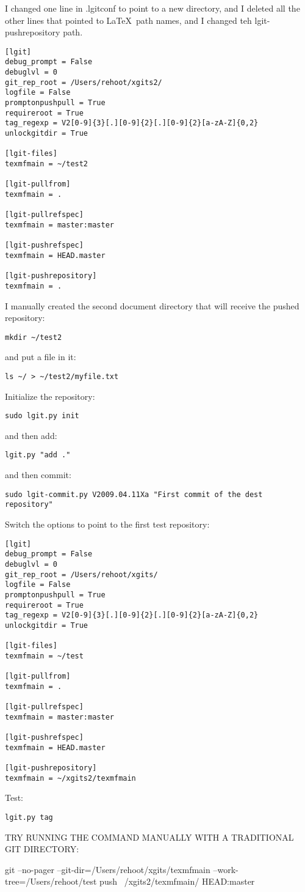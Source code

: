 \documentclass{ltxdoc}
\begin{document}
I changed one line in .lgitconf to point to a new directory, and I deleted all the other lines that pointed to \LaTeX\ path names, and I changed teh lgit-pushrepository path.
\begin{verbatim}
[lgit]
debug_prompt = False
debuglvl = 0
git_rep_root = /Users/rehoot/xgits2/
logfile = False
promptonpushpull = True
requireroot = True
tag_regexp = V2[0-9]{3}[.][0-9]{2}[.][0-9]{2}[a-zA-Z]{0,2}
unlockgitdir = True

[lgit-files]
texmfmain = ~/test2

[lgit-pullfrom]
texmfmain = .

[lgit-pullrefspec]
texmfmain = master:master

[lgit-pushrefspec]
texmfmain = HEAD.master

[lgit-pushrepository]
texmfmain = .
\end{verbatim}


I manually created the second document directory that will receive the pushed repository:
\begin{verbatim}
mkdir ~/test2
\end{verbatim}
and put a file in it:
\begin{verbatim}
ls ~/ > ~/test2/myfile.txt
\end{verbatim}

Initialize the repository:
\begin{verbatim}
sudo lgit.py init
\end{verbatim}
and then add:
\begin{verbatim}
lgit.py "add ."
\end{verbatim}
and then commit:
\begin{verbatim}
sudo lgit-commit.py V2009.04.11Xa "First commit of the dest repository"
\end{verbatim}

Switch the options to point to the first test repository:
\begin{verbatim}
[lgit]
debug_prompt = False
debuglvl = 0
git_rep_root = /Users/rehoot/xgits/
logfile = False
promptonpushpull = True
requireroot = True
tag_regexp = V2[0-9]{3}[.][0-9]{2}[.][0-9]{2}[a-zA-Z]{0,2}
unlockgitdir = True

[lgit-files]
texmfmain = ~/test

[lgit-pullfrom]
texmfmain = .

[lgit-pullrefspec]
texmfmain = master:master

[lgit-pushrefspec]
texmfmain = HEAD.master

[lgit-pushrepository]
texmfmain = ~/xgits2/texmfmain
\end{verbatim}

Test:
\begin{verbatim}
lgit.py tag
\end{verbatim}



TRY RUNNING THE COMMAND MANUALLY WITH A TRADITIONAL GIT DIRECTORY:

git --no-pager --git-dir=/Users/rehoot/xgits/texmfmain --work-tree=/Users/rehoot/test push ~/xgits2/texmfmain/ HEAD:master

\appendix
\end{document}
